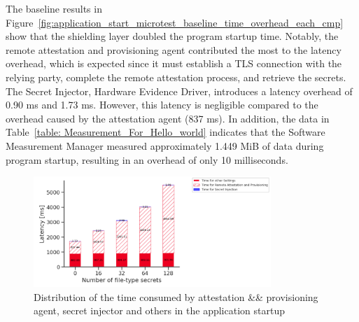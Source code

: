 The baseline results in Figure~\ref{fig:application_start_microtest_baseline_time_overhead_each_cmp} show that the shielding layer doubled the program startup time. Notably, the remote attestation and provisioning agent contributed the most to the latency overhead, which is expected since it must establish a TLS connection with the relying party, complete the 
remote attestation process, and retrieve the secrets. The Secret Injector, Hardware Evidence Driver, introduces a latency overhead of 0.90 ms and 1.73 ms. However, this latency is negligible compared to the overhead caused by the attestation agent (837 ms). In addition, the data in 
Table~\ref{table: Measurement_For_Hello_world} indicates that the Software Measurement Manager measured approximately 1.449 MiB of data during program startup, resulting in an overhead of only 10 milliseconds. 

\begin{figure}[!htb]
    \centering
    \includegraphics[width=0.8\textwidth]{images/startup_time_change_as_file_type_secret_increasing.PNG}
    \caption[Distribution of the time consumed by attestation \&\& provisioning agent, secret injector and others in the application startup]{Distribution of the time consumed by attestation \&\& provisioning agent, secret injector and others in the application startup}
    \label{fig:startup_time_change_as_file_type_secret_increasing}
\end{figure}

